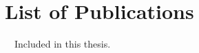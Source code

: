 \chapter*{List of Publications}
\label{publications}


\vspace{0.5cm}
\noindent
\faFileTextO~~Included in this thesis.\\
